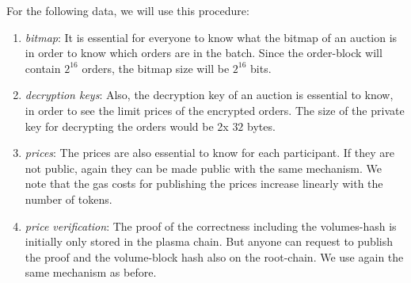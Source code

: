 \documentclass[11pt,parskip=full]{scrartcl}%
\begin{document}
For the following data, we will use this procedure:
\begin{enumerate}
\item \emph{bitmap}:
It is essential for everyone to know what the bitmap of an auction is in order to know which orders are in the batch. Since the order-block will contain $2^{16}$ orders, the bitmap size will be $2^{16}$ bits. 


\item \emph{decryption keys}:
Also, the decryption key of an auction is essential to know, in order to see the limit prices of the encrypted orders. 
The size of the private key for decrypting the orders would be 2x $32$ bytes.

\item \emph{prices}:
The prices are also essential to know for each participant. 
If they are not public, again they can be made public with the same mechanism. 
We note that the gas costs for publishing the prices increase linearly with the number of tokens.

\item \emph{price verification}:
The proof of the correctness including the volumes-hash is initially only stored in the plasma chain. 
But anyone can request to publish the proof and the volume-block hash also on the root-chain. 
We use again the same mechanism as before. 
\end{enumerate}
\end{document}
